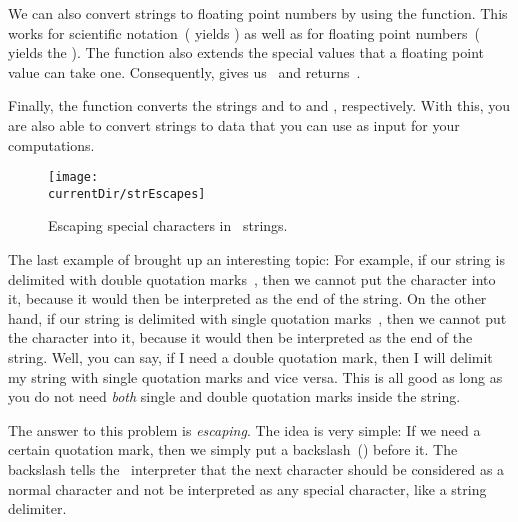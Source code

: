 We can also convert strings to floating point numbers by using the  function.
This works for scientific notation~( yields ) as well as for  floating point numbers~( yields the  ).
The  function also extends the special values that a floating point value can take one.
Consequently,  gives us~ and  returns~.

Finally, the function  converts the strings  and  to  and , respectively.
With this, you are also able to convert strings to data that you can use as input for your computations.%
%
\endhsection%
%
%
%
%
\begin{figure}%
\centering%
\texttt{[image: \\currentDir/strEscapes]}%
\caption{Escaping special characters in \python\ strings.}%
\label{fig:strEscapes}%
\end{figure}%
%
The last example of  brought up an interesting topic:
For example, if our string is delimited with double quotation marks~\pythonIdx{\textquotedbl}, then we cannot put the character  into it, because it would then be interpreted as the end of the string.
On the other hand, if our string is delimited with single quotation marks~\pythonIdx{\textquotesingle}, then we cannot put the character  into it, because it would then be interpreted as the end of the string.
Well, you can say, if I need a double quotation mark, then I will delimit my string with single quotation marks and vice versa.
This is all good as long as you do not need \emph{both} single and double quotation marks inside the string.

The answer to this problem is \emph{escaping}.
The idea is very simple:
If we need a certain quotation mark, then we simply put a backslash~(\inQuotes{\textbackslash})\pythonIdx{\textbackslash} before it.
The backslash tells the \python\ interpreter that the next character should be considered as a normal character and not be interpreted as any special character, like a string delimiter.

